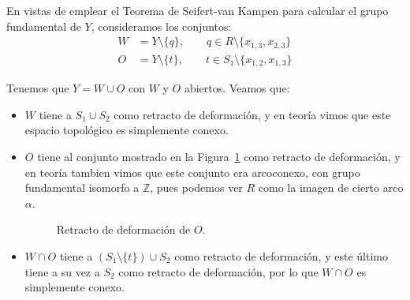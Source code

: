 \documentclass[12pt]{article}
\begin{document}
\begin{ejercicio}
\begin{enumerate}
\begin{itemize}
                    En vistas de emplear el Teorema de Seifert-van Kampen para calcular el grupo fundamental de $Y$, consideramos los conjuntos:
                    \begin{align*}
                        W &= Y\setminus \{q\}, \qquad q\in R\setminus \{x_{1,3}, x_{2,3}\} \\
                        O &= Y\setminus \{t\}, \qquad t\in S_1\setminus \{x_{1,2}, x_{1,3}\}
                    \end{align*}

                    Tenemos que $Y=W\cup O$ con $W$ y $O$ abiertos. Veamos que:
                    \begin{itemize}
                        \item $W$ tiene a $S_1\cup S_2$ como retracto de deformación, y en teoría vimos que este espacio topológico es simplemente conexo.
                        \item $O$ tiene al conjunto mostrado en la Figura~\ref{fig:retracto_O} como retracto de deformación, y en teoría tambien vimos que este conjunto era arcoconexo, con grupo fundamental isomorfo a $\mathbb{Z}$, pues podemos ver $R$ como la imagen de cierto arco $\alpha$.
                        \begin{figure}[H]
                            \centering
                            \caption{Retracto de deformación de $O$.}
                            \label{fig:retracto_O}
                        \end{figure}
                        \item $W\cap O$ tiene a $(S_1\setminus \{t\})\cup S_2$ como retracto de deformación, y este último tiene a su vez a $S_2$ como retracto de deformación, por lo que $W\cap O$ es simplemente conexo.
                    \end{itemize}


\end{itemize}
\end{enumerate}
\end{ejercicio}
\end{document}
